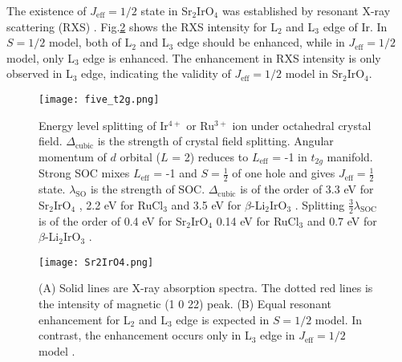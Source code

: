 \documentclass[a4,10.5pt]{report}
\begin{document}
The existence of $J_{\mathrm{eff}} = 1/2$ state in Sr$_2$IrO$_4$ was established by resonant X-ray scattering (RXS) \cite{kim2009phase}.
Fig.\ref{Sr2IrO4} shows the RXS intensity for L$_2$ and L$_3$ edge of Ir.
In $S = 1/2$ model, both of L$_2$ and L$_3$ edge should be enhanced, while in $J_\mathrm{eff} = 1/2$ model, only L$_3$ edge is enhanced.
The enhancement in RXS intensity is only observed in L$_3$ edge, indicating the validity of $J_\mathrm{eff} = 1/2$ model in Sr$_2$IrO$_4$.

\begin{figure}
  \centering
  \texttt{[image: five\_t2g.png]}
  \caption{Energy level splitting of Ir$^{4+}$ or Ru$^{3+}$ ion under octahedral crystal field.
  $\Delta_{\mathrm{cubic}}$ is the strength of crystal field splitting.
  Angular momentum of $d$ orbital ($L$ = 2) reduces to $L_{\mathrm{eff}}$ = -1 in $t_{2g}$ manifold.
  Strong SOC mixes $L_{\mathrm{eff}}$ = -1 and $S = \frac{1}{2}$ of one hole and gives $J_{\mathrm{eff}} = \frac{1}{2}$ state.
  $\lambda_{\mathrm{SO}}$ is the strength of SOC.
  $\Delta_{\mathrm{cubic}}$ is of the order of 3.3 eV for Sr$_2$IrO$_4$ \cite{ishii2011momentum}, 2.2 eV for RuCl$_3$ \cite{sandilands2016spin}
  and 3.5 eV for $\beta$-Li$_2$IrO$_3$ \cite{takayama2018pressure}.
  Splitting $\frac{3}{2}\lambda_{\mathrm{SOC}}$ is of the order of 0.4 eV for Sr$_2$IrO$_4$ \cite{kim2008novel} 0.14 eV for RuCl$_3$ \cite{sandilands2016spin} 
  and 0.7 eV for $\beta$-Li$_2$IrO$_3$ \cite{takayama2018pressure}.}
  \label{five_t2g}
\end{figure}

\begin{figure}
  \centering
  \texttt{[image: Sr2IrO4.png]}
  \caption{(A) Solid lines are X-ray absorption spectra. The dotted red lines is the intensity of magnetic (1 0 22) peak.
  (B) Equal resonant enhancement for L$_2$ and L$_3$ edge is expected in $S = 1/2$ model. In contrast, the enhancement occurs only in L$_3$ edge in $J_\mathrm{eff} = 1/2$ model
  \cite{kim2009phase}.}
  \label{Sr2IrO4}
\end{figure}
\end{document}
